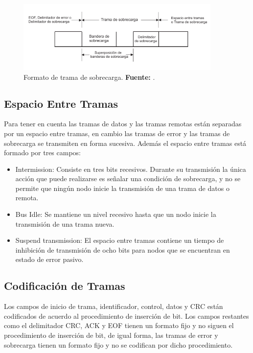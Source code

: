 \begin{itemize}
			\begin{figure}[H]
			\centering
				\includegraphics[width=0.9\textwidth]{./Cap2imagen/sobrecarga.pdf}
			\caption[Formato de trama de sobrecarga.]{Formato de trama de sobrecarga.\textbf{ Fuente:} \cite{DSEEPC}.}
			\label{TSC} 
			\end{figure}
				
\end{itemize}

\subsection {Espacio Entre Tramas}

Para tener en cuenta las tramas de datos y las tramas remotas están separadas por un espacio entre tramas, en cambio las tramas de error y las tramas de sobrecarga se transmiten en forma sucesiva.
Además el espacio entre tramas está formado por tres campos:

	\begin{itemize}
	\item Intermission: Consiste en tres bits recesivos. Durante su transmisión la única acción que puede realizarse es señalar una condición de sobrecarga, y no se permite que ningún nodo inicie la transmisión de una trama de datos o remota. 
	\item Bus Idle: Se mantiene un nivel recesivo hasta que un nodo inicie la transmisión de una trama nueva.
	\item Suspend transmission: El espacio entre tramas contiene un tiempo de inhibición de transmisión de ocho bits para nodos que se encuentran en estado de error pasivo.
	\end{itemize}


\subsection {Codificación de Tramas}

Los campos de inicio de trama, identificador, control, datos y CRC están codificados de acuerdo al procedimiento de inserción de bit. Los campos restantes como el delimitador CRC, ACK y EOF tienen un formato fijo y no siguen el procedimiento de inserción de bit, de igual forma, las tramas de error y sobrecarga tienen un formato fijo y no se codifican por dicho procedimiento.


